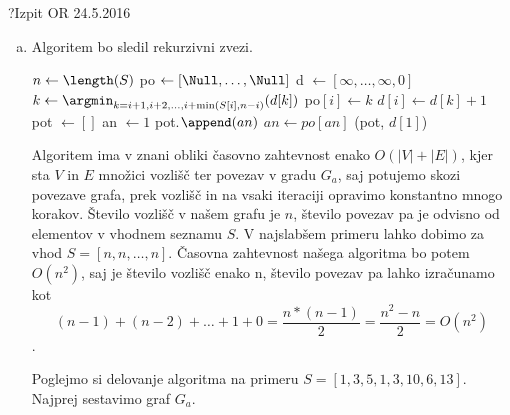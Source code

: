 \begin{naloga}{?}{Izpit OR 24.5.2016}
\begin{odgovor}
\begin{enumerate}[a)]
\item Algoritem bo sledil rekurzivni zvezi.

\begin{small}
\begin{algorithmic}
	\State $n \gets \length(S)$
	\State po $\gets [\Null, \dots, \Null]$
	\State d $\gets [\infty, \dots, \infty, 0]$
		\State $k \gets \argmin_{k = i + 1, i + 2, \dots, i + \min(S[i], n - i )}(d[k])$
		\State po$[i] \gets k$
		\State $d[i] \gets d[k] + 1$
	\EndFor
	\State pot $\gets []$
	\State an $\gets 1$
		\State pot.$\append(an)$
		\State $an \gets po[an]$
	\EndWhile
	\State \Return (pot, $d[1]$)
\EndFunction
\end{algorithmic}
\end{small}

Algoritem ima v znani obliki časovno zahtevnost enako $O(|V| + |E|)$, kjer sta $V$ in $E$ množici vozlišč ter povezav v gradu $G_a$, 
saj potujemo skozi povezave grafa, prek vozlišč in na vsaki iteraciji opravimo konstantno mnogo korakov.
Število vozlišč v našem grafu je $n$, število povezav pa je odvisno od elementov v vhodnem seznamu $S$.
V najslabšem primeru lahko dobimo za vhod $S = [n, n, \dots, n]$.
Časovna zahtevnost našega algoritma bo potem $O(n^2)$, saj je število vozlišč enako n, število povezav pa lahko izračunamo kot 
$$(n - 1) + (n - 2) +  \dots + 1 + 0 = \frac{n * (n - 1)}{2} = \frac{n ^2 - n}{2} = O(n^2)$$.

Poglejmo si delovanje algoritma na primeru $S = [1,3,5,1,3,10,6,13]$.
Najprej sestavimo graf $G_a$.



\end{enumerate}
\end{odgovor}
\end{naloga}
